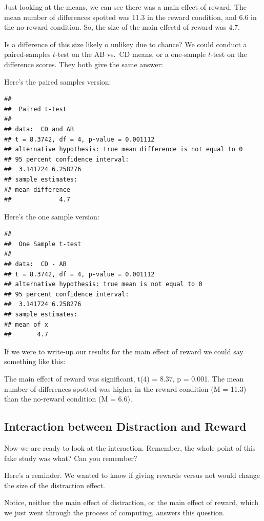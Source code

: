 \documentclass[
]{book}
\begin{document}
Just looking at the means, we can see there was a main effect of reward. The mean number of differences spotted was 11.3 in the reward condition, and 6.6 in the no-reward condition. So, the size of the main effectd of reward was 4.7.

Is a difference of this size likely o unlikey due to chance? We could conduct a paired-samples \(t\)-test on the AB vs.~CD means, or a one-sample \(t\)-test on the difference scores. They both give the same answer:

Here's the paired samples version:

\begin{verbatim}
## 
##  Paired t-test
## 
## data:  CD and AB
## t = 8.3742, df = 4, p-value = 0.001112
## alternative hypothesis: true mean difference is not equal to 0
## 95 percent confidence interval:
##  3.141724 6.258276
## sample estimates:
## mean difference 
##             4.7
\end{verbatim}

Here's the one sample version:

\begin{verbatim}
## 
##  One Sample t-test
## 
## data:  CD - AB
## t = 8.3742, df = 4, p-value = 0.001112
## alternative hypothesis: true mean is not equal to 0
## 95 percent confidence interval:
##  3.141724 6.258276
## sample estimates:
## mean of x 
##       4.7
\end{verbatim}

If we were to write-up our results for the main effect of reward we could say something like this:

The main effect of reward was significant, t(4) = 8.37, p = 0.001. The mean number of differences spotted was higher in the reward condition (M = 11.3) than the no-reward condition (M = 6.6).

\subsection{Interaction between Distraction and Reward}\label{interaction-between-distraction-and-reward}

Now we are ready to look at the interaction. Remember, the whole point of this fake study was what? Can you remember?

Here's a reminder. We wanted to know if giving rewards versus not would change the size of the distraction effect.

Notice, neither the main effect of distraction, or the main effect of reward, which we just went through the process of computing, answers this question.
\end{document}
